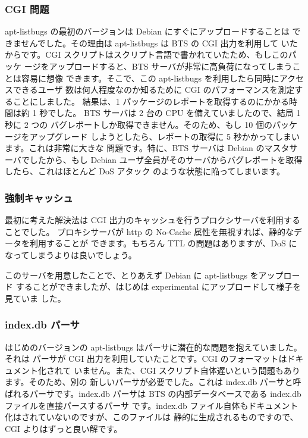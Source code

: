 \documentclass[mingoth,a4paper]{jsarticle}
\begin{document}
\subsubsection{CGI 問題}

apt-listbugs の最初のバージョンは Debian にすぐにアップロードすることは
できませんでした。その理由は apt-listbugs は BTS の CGI 出力を利用して
いたからです。CGI スクリプトはスクリプト言語で書かれていたため、もしこのパッケ
ージをアップロードすると、BTS サーバが非常に高負荷になってしまうことは容易に想像
できます。そこで、この apt-listbugs を利用したら同時にアクセスできるユーザ
数は何人程度なのか知るために CGI のパフォーマンスを測定することにしました。
結果は、1 パッケージのレポートを取得するのにかかる時間は約 1 秒でした。
BTS サーバは 2 台の CPU を備えていましたので、結局 1 秒に 2 つの
バグレポートしか取得できません。そのため、もし 10 個のパッケージをアップグレード
しようとしたら、レポートの取得に 5 秒かかってしまいます。これは非常に大きな
問題です。特に、BTS サーバは Debian のマスタサーバでしたから、もし Debian
ユーザ全員がそのサーバからバグレポートを取得したら、これはほとんど DoS アタック
のような状態に陥ってしまいます。

\subsubsection{強制キャッシュ}

最初に考えた解決法は CGI 出力のキャッシュを行うプロクシサーバを利用することでした。
プロキシサーバが http の No-Cache 属性を無視すれば、静的なデータを利用することが
できます。もちろん TTL の問題はありますが、DoS になってしまうよりは良いでしょう。

このサーバを用意したことで、とりあえず Debian に apt-listbugs をアップロード
することができましたが、はじめは experimental にアップロードして様子を見ていま
した。

\subsubsection{index.db パーサ}

はじめのバージョンの apt-listbugs はパーサに潜在的な問題を抱えていました。それは
パーサが CGI 出力を利用していたことです。CGI のフォーマットはドキュメント化されて
いません。また、CGI スクリプト自体遅いという問題もあります。そのため、別の
新しいパーサが必要でした。これは index.db パーサと呼ばれるパーサです。index.db
パーサは BTS の内部データベースである index.db ファイルを直接パースするパーサ
です。index.db ファイル自体もドキュメント化はされていないのですが、このファイルは
静的に生成されるものですので、CGI よりはずっと良い解です。
\end{document}
